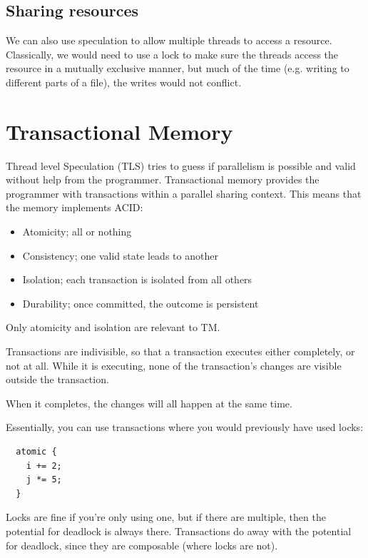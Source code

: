 \subsection{Sharing resources}

We can also use speculation to allow multiple threads to access a
resource. Classically, we would need to use a lock to make sure the
threads access the resource in a mutually exclusive manner, but much
of the time (e.g. writing to different parts of a file), the writes
would not conflict.


\section{Transactional Memory}

Thread level Speculation (TLS) tries to guess if parallelism is
possible and valid without help from the programmer. Transactional
memory provides the programmer with transactions within a parallel
sharing context. This means that the memory implements ACID:

\begin{itemize}
\item Atomicity; all or nothing
\item Consistency; one valid state leads to another
\item Isolation; each transaction is isolated from all others 
\item Durability; once committed, the outcome is persistent
\end{itemize}

Only atomicity and isolation are relevant to TM.

Transactions are indivisible, so that a transaction executes either
completely, or not at all. While it is executing, none of the
transaction's changes are visible outside the transaction.

When it completes, the changes will all happen at the same time.

Essentially, you can use transactions where you would previously have
used locks:

\begin{verbatim}
  atomic {
    i += 2;
    j *= 5;
  }
\end{verbatim}

Locks are fine if you're only using one, but if there are multiple,
then the potential for deadlock is always there. Transactions do away
with the potential for deadlock, since they are composable (where
locks are not).

